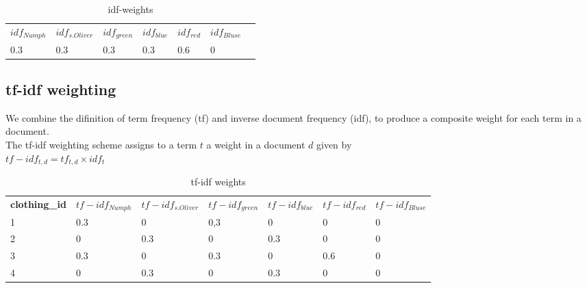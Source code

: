 \bigskip
\begin{table}[h]
    \begin{center}
    \begin{tabular}{ l l l l l l l }
        \rowcolor{Gray}
        \textbf{$idf_{Numph}$} & \textbf{$idf_{s.Oliver}$} & \textbf{$idf_{green}$} & \textbf{$idf_{blue}$} & \textbf{$idf_{red}$} & \textbf{$idf_{Bluse}$}\\
        0.3                    & 0.3                       & 0.3                    & 0.3                   & 0.6                  & 0
    \end{tabular}
    \caption{idf-weights}
    \end{center}
\end{table}


\subsection{tf-idf weighting}
We combine the difinition of term frequency (tf) and inverse document frequency (idf), to produce a composite weight for each term in a document.\\
The tf-idf weighting scheme assigns to a term $t$ a weight in a document $d$ given by\\

$tf-idf_{t,d}= tf_{t,d} \times idf_t$

\bigskip
\begin{table}[h]
    \begin{center}
    \begin{tabular}{ l l l l l l l }
        \rowcolor{Gray}
        \textbf{clothing\_id}   & \textbf{$tf-idf_{Numph}$} & \textbf{$tf-idf_{s.Oliver}$}   & \textbf{$tf-idf_{green}$}    & \textbf{$tf-idf_{blue}$} & \textbf{$tf-idf_{red}$} & \textbf{$tf-idf_{Bluse}$}\\
        1                       & 0.3              & 0                   &  0,3              & 0             & 0            & 0\\
        2                       & 0                & 0.3                 & 0                 & 0.3           & 0            & 0\\
        3                       & 0.3              & 0                   & 0.3               & 0             & 0.6          & 0\\
        4                       & 0                & 0.3                 & 0                 & 0.3           & 0            & 0\\
    \end{tabular}
    \caption{tf-idf weights}
    \end{center}
\end{table}










